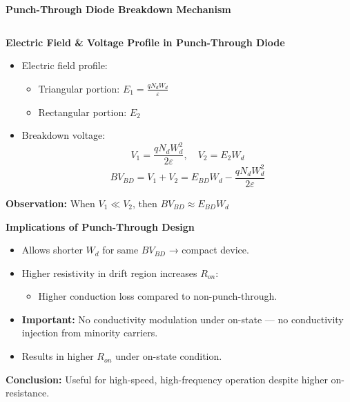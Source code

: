 \begin{frame}{\textbf{Punch-Through Diode Breakdown Mechanism}}
\begin{columns}
    \end{columns}
\end{frame}


\begin{frame}{\textbf{Electric Field \& Voltage Profile in Punch-Through Diode}}
    \begin{itemize}
        \item Electric field profile:
        \begin{itemize}
            \item Triangular portion: $E_1 = \frac{qN_dW_d}{\varepsilon}$
            \item Rectangular portion: $E_2$
        \end{itemize}
        \item Breakdown voltage:
        \begin{equation}
            V_1 = \frac{qN_dW_d^2}{2\varepsilon}, \quad V_2 = E_2 W_d
        \end{equation}
        \begin{equation}
            BV_{BD} = V_1 + V_2 = E_{BD}W_d - \frac{qN_dW_d^2}{2\varepsilon}
        \end{equation}
    \end{itemize}
    \textbf{Observation:} When $V_1 \ll V_2$, then $BV_{BD} \approx E_{BD}W_d$
\end{frame}

\begin{frame}{\textbf{Implications of Punch-Through Design}}
    \begin{itemize}
        \item Allows shorter $W_d$ for same $BV_{BD}$ → compact device.
        \item Higher resistivity in drift region increases $R_{on}$:
        \begin{itemize}
            \item Higher conduction loss compared to non-punch-through.
        \end{itemize}
        \item \textbf{Important:} No conductivity modulation under on-state — no conductivity injection from minority carriers.
        \item Results in higher $R_{on}$ under on-state condition.
    \end{itemize}
    \textbf{Conclusion:} Useful for high-speed, high-frequency operation despite higher on-resistance.
\end{frame}